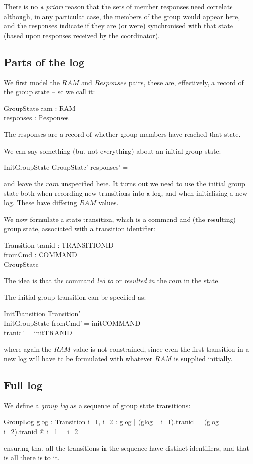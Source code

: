 \documentclass[a4paper,12pt]{article}
\begin{document}
There is no {\it a priori} reason that the sets of member responses need correlate although, in any particular case, the members of the group would appear here, and the responses indicate if they are (or were) synchronised with that state (based upon responses received by the coordinator).

\subsection{Parts of the log}
We first model the $RAM$ and $Responses$ pairs, these are, effectively, a record of the group state -- so we call it:
\begin{schema}{GroupState}
	ram : RAM		\\
	responses : Responses
\end{schema}
The responses are a record of whether group members have reached that state.

We can say something (but not everything) about an initial group state:
\begin{schema}{InitGroupState}
	GroupState'
\where
	responses' = \emptyset
\end{schema}
and leave the $ram$ unspecified here. It turns out we need to use the initial group state both when recording new transitions into a log, and when initialising a new log. These have differing $RAM$ values.

We now formulate a state transition, which is a command and (the resulting) group state, associated with a transition identifier:
\begin{schema}{Transition}
	tranid : TRANSITIONID	\\
	fromCmd : COMMAND	\\
	GroupState
\end{schema}
The idea is that the command \emph{led to} or \emph{resulted in} the $ram$ in the state. 

The initial group transition can be specified as:
\begin{schema}{InitTransition}
	Transition'		\\
	InitGroupState
\where
	fromCmd' = initCOMMAND	\\
	tranid' = initTRANID
\end{schema}
where again the $RAM$ value is not constrained, since even the first transition in a new log will have to be formulated with whatever $RAM$ is supplied initially.

\subsection{Full log}
We define a \emph{group log} as a sequence of group state transitions:
\begin{schema}{GroupLog}
	glog : \seq Transition
\where
	\forall i_1, i_2 : \dom glog | (glog ~ i_1).tranid = (glog ~ i_2).tranid @ i_1 = i_2
\end{schema}
ensuring that all the transitions in the sequence have distinct identifiers, 
and that is all there is to it.
\end{document}
